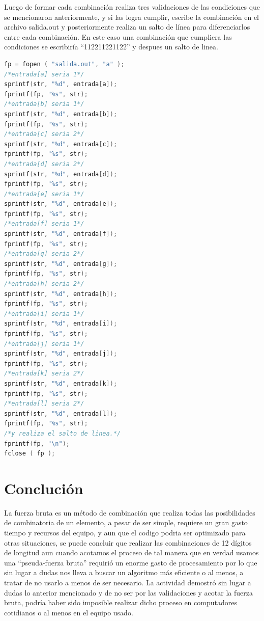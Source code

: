\documentclass[9pt,twocolumn,twoside]{optica}
\begin{document}
Luego de formar cada combinación realiza tres validaciones de las condiciones que se mencionaron anteriormente, y si las logra cumplir, escribe la combinación en el archivo salida.out y posteriormente realiza un salto de línea para diferenciarlos entre cada combinación. En este caso una combinación que cumpliera las condiciones se escribiría “112211221122” y despues un salto de linea.

\begin{lstlisting}[language=C]
fp = fopen ( "salida.out", "a" );
/*entrada[a] seria 1*/
sprintf(str, "%d", entrada[a]);
fprintf(fp, "%s", str);
/*entrada[b] seria 1*/
sprintf(str, "%d", entrada[b]);
fprintf(fp, "%s", str);
/*entrada[c] seria 2*/
sprintf(str, "%d", entrada[c]);
fprintf(fp, "%s", str);
/*entrada[d] seria 2*/
sprintf(str, "%d", entrada[d]);
fprintf(fp, "%s", str);
/*entrada[e] seria 1*/
sprintf(str, "%d", entrada[e]);
fprintf(fp, "%s", str);
/*entrada[f] seria 1*/
sprintf(str, "%d", entrada[f]);
fprintf(fp, "%s", str);
/*entrada[g] seria 2*/
sprintf(str, "%d", entrada[g]);
fprintf(fp, "%s", str);
/*entrada[h] seria 2*/
sprintf(str, "%d", entrada[h]);
fprintf(fp, "%s", str);
/*entrada[i] seria 1*/
sprintf(str, "%d", entrada[i]);
fprintf(fp, "%s", str);
/*entrada[j] seria 1*/
sprintf(str, "%d", entrada[j]);
fprintf(fp, "%s", str);
/*entrada[k] seria 2*/
sprintf(str, "%d", entrada[k]);
fprintf(fp, "%s", str);
/*entrada[l] seria 2*/
sprintf(str, "%d", entrada[l]);
fprintf(fp, "%s", str);
/*y realiza el salto de linea.*/
fprintf(fp, "\n");
fclose ( fp );
\end{lstlisting}

\section{Conclución}

La fuerza bruta es un método de combinación que realiza todas las posibilidades de combinatoria de un elemento, a pesar de ser simple, requiere un gran gasto tiempo y recursos del equipo, y aun que el codigo podria ser optimizado para otras situaciones, se puede concluir que realizar las combinaciones de 12 dígitos de longitud aun cuando acotamos el proceso de tal manera que en verdad usamos una “pseuda-fuerza bruta” requirió un enorme gasto de procesamiento por lo que sin lugar a dudas nos lleva a buscar un algoritmo más eficiente o al menos, a tratar de no usarlo a menos de ser necesario.
La actividad demostró sin lugar a dudas lo anterior mencionado y de no ser por las validaciones y acotar la fuerza bruta, podría haber sido imposible realizar dicho proceso en computadores cotidianos o al menos en el equipo usado.





\end{document}
